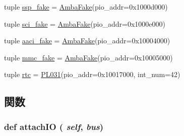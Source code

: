 \begin{DoxyCompactItemize}
tuple \hyperlink{classRealView_1_1RealViewPBX_a663792173a35cbb5279a335c3cda0e15}{ssp\_\-fake} = \hyperlink{classRealView_1_1AmbaFake}{AmbaFake}(pio\_\-addr=0x1000d000)
\item 
tuple \hyperlink{classRealView_1_1RealViewPBX_a3f48d40a61aee1b51e22944a6926a4c3}{sci\_\-fake} = \hyperlink{classRealView_1_1AmbaFake}{AmbaFake}(pio\_\-addr=0x1000e000)
\item 
tuple \hyperlink{classRealView_1_1RealViewPBX_a40e0278b62fc0e814579ee52118d2e2a}{aaci\_\-fake} = \hyperlink{classRealView_1_1AmbaFake}{AmbaFake}(pio\_\-addr=0x10004000)
\item 
tuple \hyperlink{classRealView_1_1RealViewPBX_aea1f4d5125bc4930882b7415e32696dc}{mmc\_\-fake} = \hyperlink{classRealView_1_1AmbaFake}{AmbaFake}(pio\_\-addr=0x10005000)
\item 
tuple \hyperlink{classRealView_1_1RealViewPBX_a8dc27866c57f35c90dbd18e3d7d154aa}{rtc} = \hyperlink{classRealView_1_1PL031}{PL031}(pio\_\-addr=0x10017000, int\_\-num=42)
\end{DoxyCompactItemize}


\subsection{関数}
\hypertarget{classRealView_1_1RealViewPBX_ac750675f6d6de3ad52f8c5b03ee45a65}{
\subsubsection[{attachIO}]{\setlength{\rightskip}{0pt plus 5cm}def attachIO ( {\em self}, \/   {\em bus})}}
\label{classRealView_1_1RealViewPBX_ac750675f6d6de3ad52f8c5b03ee45a65}



